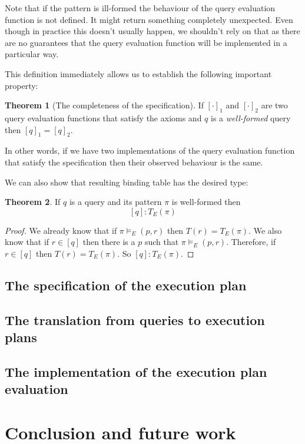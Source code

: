 \documentclass[14pt]{constructor-thesis}
\theoremstyle{definition}
\newtheorem*{theorem}{Theorem}
\begin{document}
Note that if the pattern is ill-formed the behaviour of the query evaluation function is not defined. It might return something completely unexpected. Even though in practice this doesn't usually happen, we shouldn't rely on that as there are no guarantees that the query evaluation function will be implemented in a particular way.

This definition immediately allows us to establish the following important property:
\begin{theorem}[The completeness of the specification]
  If $[\cdot]_1$ and $[\cdot]_2$ are two query evaluation functions that satisfy the axioms and $q$ is a \textit{well-formed} query then $[q]_1 = [q]_2$.
\end{theorem}

In other words, if we have two implementations of the query evaluation function that satisfy the specification then their observed behaviour is the same.

We can also show that resulting binding table has the desired type:
\begin{theorem}
  If $q$ is a query and its pattern $\pi$ is well-formed then
  $$[q] : T_E(\pi)$$
\end{theorem}
\begin{proof}
  We already know that if $\pi \models_E (p, r)$ then $T(r) = T_E(\pi)$. We also know that if $r \in [q]$ then there is a $p$ such that $\pi \models_E (p, r)$. Therefore, if $r \in [q]$ then $T(r) = T_E(\pi)$. So $[q] : T_E(\pi)$.
\end{proof}

\subsection{The specification of the execution plan}


\subsection{The translation from queries to execution plans}

\subsection{The implementation of the execution plan evaluation}


\section*{Conclusion and future work}

\setmonofont[Mapping=tex-text]{CMU Typewriter Text}
% 
% 
\printbibliography
\end{document}
